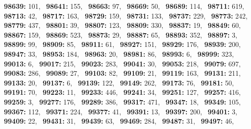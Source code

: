 \textbf{98639:} 101,\allowbreak~ 
\textbf{98641:} 155,\allowbreak~ 
\textbf{98663:} 97,\allowbreak~ 
\textbf{98669:} 50,\allowbreak~ 
\textbf{98689:} 114,\allowbreak~ 
\textbf{98711:} 619,\allowbreak~ 
\textbf{98713:} 42,\allowbreak~ 
\textbf{98717:} 163,\allowbreak~ 
\textbf{98729:} 159,\allowbreak~ 
\textbf{98731:} 133,\allowbreak~ 
\textbf{98737:} 229,\allowbreak~ 
\textbf{98773:} 242,\allowbreak~ 
\textbf{98779:} 437,\allowbreak~ 
\textbf{98801:} 39,\allowbreak~ 
\textbf{98807:} 123,\allowbreak~ 
\textbf{98809:} 330,\allowbreak~ 
\textbf{98837:} 19,\allowbreak~ 
\textbf{98849:} 60,\allowbreak~ 
\textbf{98867:} 159,\allowbreak~ 
\textbf{98869:} 523,\allowbreak~ 
\textbf{98873:} 29,\allowbreak~ 
\textbf{98887:} 65,\allowbreak~ 
\textbf{98893:} 352,\allowbreak~ 
\textbf{98897:} 3,\allowbreak~ 
\textbf{98899:} 99,\allowbreak~ 
\textbf{98909:} 85,\allowbreak~ 
\textbf{98911:} 61,\allowbreak~ 
\textbf{98927:} 151,\allowbreak~ 
\textbf{98929:} 176,\allowbreak~ 
\textbf{98939:} 200,\allowbreak~ 
\textbf{98947:} 33,\allowbreak~ 
\textbf{98953:} 184,\allowbreak~ 
\textbf{98963:} 20,\allowbreak~ 
\textbf{98981:} 86,\allowbreak~ 
\textbf{98993:} 6,\allowbreak~ 
\textbf{98999:} 323,\allowbreak~ 
\textbf{99013:} 6,\allowbreak~ 
\textbf{99017:} 215,\allowbreak~ 
\textbf{99023:} 283,\allowbreak~ 
\textbf{99041:} 30,\allowbreak~ 
\textbf{99053:} 218,\allowbreak~ 
\textbf{99079:} 697,\allowbreak~ 
\textbf{99083:} 286,\allowbreak~ 
\textbf{99089:} 27,\allowbreak~ 
\textbf{99103:} 82,\allowbreak~ 
\textbf{99109:} 21,\allowbreak~ 
\textbf{99119:} 163,\allowbreak~ 
\textbf{99131:} 211,\allowbreak~ 
\textbf{99133:} 20,\allowbreak~ 
\textbf{99137:} 6,\allowbreak~ 
\textbf{99139:} 122,\allowbreak~ 
\textbf{99149:} 262,\allowbreak~ 
\textbf{99173:} 76,\allowbreak~ 
\textbf{99181:} 50,\allowbreak~ 
\textbf{99191:} 70,\allowbreak~ 
\textbf{99223:} 11,\allowbreak~ 
\textbf{99233:} 446,\allowbreak~ 
\textbf{99241:} 34,\allowbreak~ 
\textbf{99251:} 127,\allowbreak~ 
\textbf{99257:} 416,\allowbreak~ 
\textbf{99259:} 3,\allowbreak~ 
\textbf{99277:} 176,\allowbreak~ 
\textbf{99289:} 386,\allowbreak~ 
\textbf{99317:} 471,\allowbreak~ 
\textbf{99347:} 18,\allowbreak~ 
\textbf{99349:} 105,\allowbreak~ 
\textbf{99367:} 112,\allowbreak~ 
\textbf{99371:} 224,\allowbreak~ 
\textbf{99377:} 41,\allowbreak~ 
\textbf{99391:} 13,\allowbreak~ 
\textbf{99397:} 200,\allowbreak~ 
\textbf{99401:} 3,\allowbreak~ 
\textbf{99409:} 22,\allowbreak~ 
\textbf{99431:} 31,\allowbreak~ 
\textbf{99439:} 63,\allowbreak~ 
\textbf{99469:} 284,\allowbreak~ 
\textbf{99487:} 31,\allowbreak~ 
\textbf{99497:} 46,\allowbreak~ 
